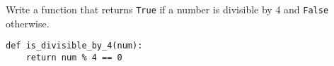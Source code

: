 \begin{blocksection}
\question Write a function that returns \lstinline{True} if a number is divisible by 4 and \lstinline{False} otherwise.




\vspace{2in}



\begin{solution}[1in]
\begin{lstlisting}
def is_divisible_by_4(num):
    return num % 4 == 0
\end{lstlisting}
\end{solution}
\end{blocksection}
